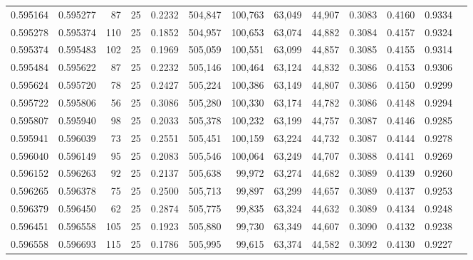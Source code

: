\begin{tabular}{rrrrrrrrrrrrr}
0.595164 & 0.595277 &    87 &  25 &                                     0.2232 & 504,847 & 100,763 &  63,049 &  44,907 & 0.3083 & 0.4160 & 0.9334 \\
0.595278 & 0.595374 &   110 &  25 &                                     0.1852 & 504,957 & 100,653 &  63,074 &  44,882 & 0.3084 & 0.4157 & 0.9324 \\
0.595374 & 0.595483 &   102 &  25 &                                     0.1969 & 505,059 & 100,551 &  63,099 &  44,857 & 0.3085 & 0.4155 & 0.9314 \\
0.595484 & 0.595622 &    87 &  25 &                                     0.2232 & 505,146 & 100,464 &  63,124 &  44,832 & 0.3086 & 0.4153 & 0.9306 \\
0.595624 & 0.595720 &    78 &  25 &                                     0.2427 & 505,224 & 100,386 &  63,149 &  44,807 & 0.3086 & 0.4150 & 0.9299 \\
0.595722 & 0.595806 &    56 &  25 &                                     0.3086 & 505,280 & 100,330 &  63,174 &  44,782 & 0.3086 & 0.4148 & 0.9294 \\
0.595807 & 0.595940 &    98 &  25 &                                     0.2033 & 505,378 & 100,232 &  63,199 &  44,757 & 0.3087 & 0.4146 & 0.9285 \\
0.595941 & 0.596039 &    73 &  25 &                                     0.2551 & 505,451 & 100,159 &  63,224 &  44,732 & 0.3087 & 0.4144 & 0.9278 \\
0.596040 & 0.596149 &    95 &  25 &                                     0.2083 & 505,546 & 100,064 &  63,249 &  44,707 & 0.3088 & 0.4141 & 0.9269 \\
0.596152 & 0.596263 &    92 &  25 &                                     0.2137 & 505,638 &  99,972 &  63,274 &  44,682 & 0.3089 & 0.4139 & 0.9260 \\
0.596265 & 0.596378 &    75 &  25 &                                     0.2500 & 505,713 &  99,897 &  63,299 &  44,657 & 0.3089 & 0.4137 & 0.9253 \\
0.596379 & 0.596450 &    62 &  25 &                                     0.2874 & 505,775 &  99,835 &  63,324 &  44,632 & 0.3089 & 0.4134 & 0.9248 \\
0.596451 & 0.596558 &   105 &  25 &                                     0.1923 & 505,880 &  99,730 &  63,349 &  44,607 & 0.3090 & 0.4132 & 0.9238 \\
0.596558 & 0.596693 &   115 &  25 &                                     0.1786 & 505,995 &  99,615 &  63,374 &  44,582 & 0.3092 & 0.4130 & 0.9227 \\

\end{tabular}
